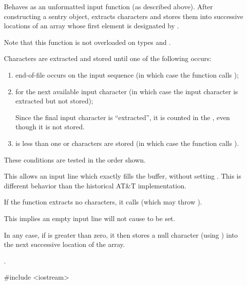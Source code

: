 \begin{itemdescr}
\pnum
\effects
Behaves as an unformatted input function
(as described above).
After constructing a sentry object, extracts
characters and stores them
into successive locations of an array whose first element is designated by
.
\begin{footnote}
Note that this function is not overloaded on types
and
.
\end{footnote}
Characters are extracted and stored until one of the following occurs:
\begin{enumerate}
\item
end-of-file occurs on the input sequence
(in which case the function calls
);
\item
{}
for the next available input
character 
(in which case the input character is extracted but not stored);
\begin{footnote}
Since
the final input character is ``extracted'',
it is counted in the
,
even though it is not stored.
\end{footnote}
\item
{} is less than one or 
characters are stored
(in which case the function calls
).
\end{enumerate}

\pnum
These conditions are tested in the order shown.
\begin{footnote}
This allows an input
line which exactly fills the buffer, without setting
.
This is different behavior than the historical AT\&T implementation.
\end{footnote}

\pnum
If the function extracts no characters, it calls
(which may throw
).
\begin{footnote}
This implies an
empty input line will not cause
to be set.
\end{footnote}

\pnum
In any case, if  is greater than zero, it then stores a null character
(using
)
into the next successive location of the array.

\pnum
\returns
{}.

\pnum
\begin{example}
\begin{codeblock}
#include <iostream>


\end{codeblock}
\end{example}
\end{itemdescr}
